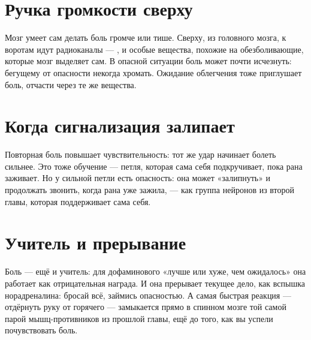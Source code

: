 \section*{Ручка громкости сверху}

Мозг умеет сам делать боль громче или тише. Сверху, из головного мозга, к воротам идут радиоканалы --- ,  и особые вещества, похожие на обезболивающие, которые мозг выделяет сам. В опасной ситуации боль может почти исчезнуть: бегущему от опасности некогда хромать. Ожидание облегчения тоже приглушает боль, отчасти через те же вещества.

\section*{Когда сигнализация залипает}

Повторная боль повышает чувствительность: тот же удар начинает болеть сильнее. Это тоже обучение --- петля, которая сама себя подкручивает, пока рана заживает. Но у сильной петли есть опасность: она может «залипнуть» и продолжать звонить, когда рана уже зажила, --- как группа нейронов из второй главы, которая поддерживает сама себя.

\section*{Учитель и прерывание}

Боль --- ещё и учитель: для дофаминового «лучше или хуже, чем ожидалось» она работает как отрицательная награда. И она прерывает текущее дело, как вспышка норадреналина: бросай всё, займись опасностью. А самая быстрая реакция --- отдёрнуть руку от горячего --- замыкается прямо в спинном мозге той самой парой мышц-противников из прошлой главы, ещё до того, как вы успели почувствовать боль.


